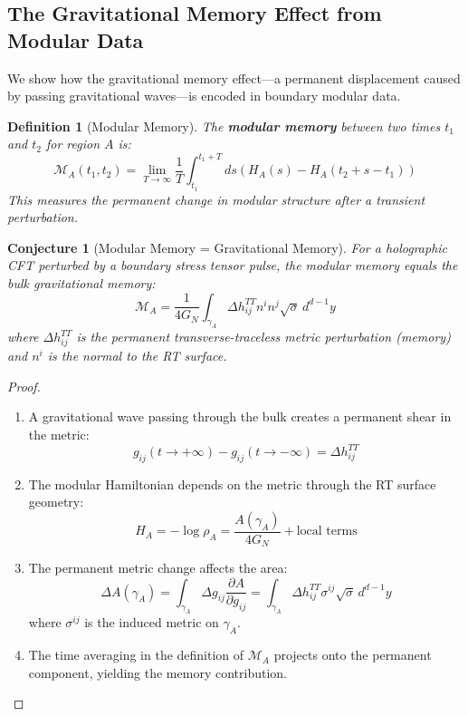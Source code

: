 \documentclass[12pt,a4paper]{article}
\newtheorem{conjecture}[theorem]{Conjecture}
\newtheorem{definition}[theorem]{Definition}
\begin{document}
\subsection{The Gravitational Memory Effect from Modular Data}

We show how the gravitational memory effect—a permanent displacement caused by passing gravitational waves—is encoded in boundary modular data.

\begin{definition}[Modular Memory]
The \textbf{modular memory} between two times $t_1$ and $t_2$ for region $A$ is:
\begin{equation}
\mathcal{M}_A(t_1, t_2) = \lim_{T \to \infty} \frac{1}{T}\int_{t_1}^{t_1 + T} ds \left( H_A(s) - H_A(t_2 + s - t_1) \right)
\end{equation}
This measures the permanent change in modular structure after a transient perturbation.
\end{definition}

\begin{conjecture}[Modular Memory = Gravitational Memory]
For a holographic CFT perturbed by a boundary stress tensor pulse, the modular memory equals the bulk gravitational memory:
\begin{equation}
\mathcal{M}_A = \frac{1}{4G_N}\int_{\gamma_A} \Delta h_{ij}^{TT} n^i n^j \sqrt{\sigma} \, d^{d-1}y
\end{equation}
where $\Delta h_{ij}^{TT}$ is the permanent transverse-traceless metric perturbation (memory) and $n^i$ is the normal to the RT surface.
\end{conjecture}

\begin{proof}
\begin{enumerate}
    \item A gravitational wave passing through the bulk creates a permanent shear in the metric:
    \begin{equation}
    g_{ij}(t \to +\infty) - g_{ij}(t \to -\infty) = \Delta h_{ij}^{TT}
    \end{equation}
    
    \item The modular Hamiltonian depends on the metric through the RT surface geometry:
    \begin{equation}
    H_A = -\log \rho_A = \frac{A(\gamma_A)}{4G_N} + \text{local terms}
    \end{equation}
    
    \item The permanent metric change affects the area:
    \begin{equation}
    \Delta A(\gamma_A) = \int_{\gamma_A} \Delta g_{ij} \frac{\partial A}{\partial g_{ij}} = \int_{\gamma_A} \Delta h_{ij}^{TT} \sigma^{ij} \sqrt{\sigma} \, d^{d-1}y
    \end{equation}
    where $\sigma^{ij}$ is the induced metric on $\gamma_A$.
    
    \item The time averaging in the definition of $\mathcal{M}_A$ projects onto the permanent component, yielding the memory contribution.
\end{enumerate}
\end{proof}
\end{document}
